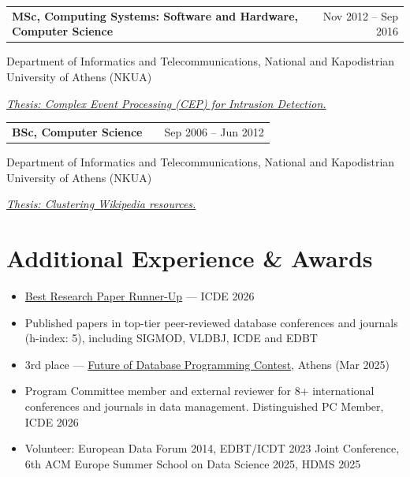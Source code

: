 \documentclass[a4paper,10pt]{article}
\makeatletter
\newenvironment{job}[2]
{
	\begin{tabularx}{\linewidth}{@{}l X r@{}}
		\small
		\textbf{#1} & \hfill &  #2 \\[3.75pt]
	\end{tabularx}
	\footnotesize
	\setlength{\parskip}{3pt} %
	\setlength{\parindent}{0pt} %
}
{
}
\makeatother
\begin{document}
\vspace{0.2\baselineskip}


\begin{job}{MSc, Computing Systems: Software and Hardware, Computer Science}{Nov 2012 – Sep 2016}
	Department of Informatics and Telecommunications, National and Kapodistrian University of Athens (NKUA)
	
	\underline{\textit{Thesis: Complex Event Processing (CEP) for Intrusion Detection.}}	
\end{job}

\vspace{0.2\baselineskip}

\begin{job}{BSc, Computer Science}{Sep 2006 – Jun 2012}
	Department of Informatics and Telecommunications, National and Kapodistrian University of Athens (NKUA)
	
	\underline{\textit{Thesis: Clustering Wikipedia resources.}}
\end{job}









\section{Additional Experience \& Awards}


\begin{itemize}
	
	\item \href{https://icde2026.github.io/awards.html}{Best Research Paper Runner-Up} — ICDE 2026
	\item Published papers in top-tier peer-reviewed database conferences and journals (h-index: 5), including SIGMOD, VLDBJ, ICDE and EDBT
	\item 3rd place — \href{https://databasecontest2024.athenarc.gr/}{Future of Database Programming Contest}, Athens (Mar 2025)
	\item Program Committee member and external reviewer for 8+ international conferences and journals in data management. Distinguished PC Member, ICDE 2026
	\item Volunteer: European Data Forum 2014, EDBT/ICDT 2023 Joint Conference, 6th ACM Europe Summer School on Data Science 2025, HDMS 2025
\end{itemize}
	
\end{document}
